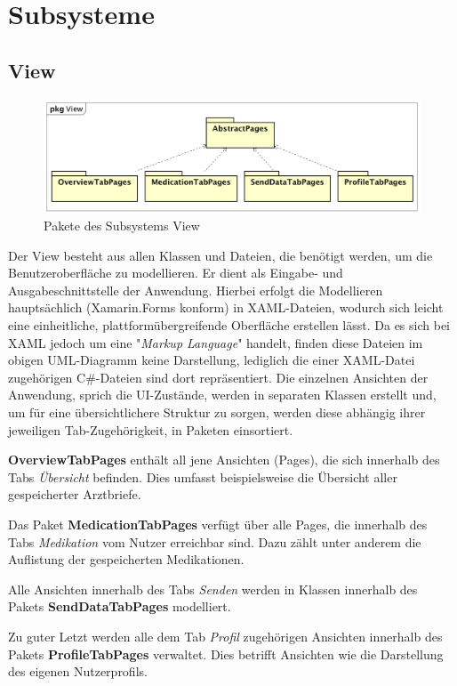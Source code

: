 \documentclass[a4paper]{scrreprt}
\begin{document}
\section{Subsysteme}
\subsection{View}
\begin{figure}[H]
\centering
\includegraphics[width=0.75\textheight]{graphics/Klassendiagramme/View/ViewLayout.png}
\caption{Pakete des Subsystems View}
\end{figure}
Der View besteht aus allen Klassen und Dateien, die benötigt werden, um die Benutzeroberfläche zu modellieren. Er dient als Eingabe- und Ausgabeschnittstelle der Anwendung.
Hierbei erfolgt die Modellieren hauptsächlich (Xamarin.Forms konform) in XAML-Dateien, wodurch sich leicht eine einheitliche, plattformübergreifende Oberfläche erstellen lässt. Da es sich bei XAML jedoch um eine "\textit{Markup Language}" handelt, finden diese Dateien im obigen UML-Diagramm keine Darstellung, lediglich die einer XAML-Datei zugehörigen C\#-Dateien sind dort repräsentiert.
Die einzelnen Ansichten der Anwendung, sprich die UI-Zustände, werden in separaten Klassen erstellt und, um für eine übersichtlichere Struktur zu sorgen, werden diese abhängig ihrer jeweiligen Tab-Zugehörigkeit, in Paketen einsortiert.

\textbf{OverviewTabPages} enthält all jene Ansichten (Pages), die sich innerhalb des Tabs \textit{Übersicht} befinden. Dies umfasst beispielsweise die Übersicht aller gespeicherter Arztbriefe.

Das Paket \textbf{MedicationTabPages} verfügt über alle Pages, die innerhalb des Tabs \textit{Medikation} vom Nutzer erreichbar sind. Dazu zählt unter anderem die Auflistung der gespeicherten Medikationen.

Alle Ansichten innerhalb des Tabs \textit{Senden} werden in Klassen innerhalb des Pakets \textbf{SendDataTabPages} modelliert.

Zu guter Letzt werden alle dem Tab \textit{Profil} zugehörigen Ansichten innerhalb des Pakets \textbf{ProfileTabPages} verwaltet. Dies betrifft Ansichten wie die Darstellung des eigenen Nutzerprofils.
\end{document}
